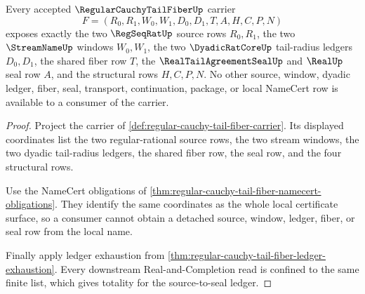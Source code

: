 \begin{theorem}
\label{thm:regular-cauchy-tail-fiber-source-seal-ledger-totality}
Every accepted $\RegularCauchyTailFiberUp$ carrier
$$
F=(R_0,R_1,W_0,W_1,D_0,D_1,T,A,H,C,P,N)
$$
exposes exactly the two $\RegSeqRatUp$ source rows $R_0,R_1$, the two $\StreamNameUp$ windows $W_0,W_1$, the two $\DyadicRatCoreUp$ tail-radius ledgers $D_0,D_1$, the shared fiber row $T$, the $\RealTailAgreementSealUp$ and $\RealUp$ seal row $A$, and the structural rows $H,C,P,N$. No other source, window, dyadic ledger, fiber, seal, transport, continuation, package, or local NameCert row is available to a consumer of the carrier.
\end{theorem}
\begin{proof}
Project the carrier of \autoref{def:regular-cauchy-tail-fiber-carrier}. Its displayed coordinates list the two regular-rational source rows, the two stream windows, the two dyadic tail-radius ledgers, the shared fiber row, the seal row, and the four structural rows.

Use the NameCert obligations of \autoref{thm:regular-cauchy-tail-fiber-namecert-obligations}. They identify the same coordinates as the whole local certificate surface, so a consumer cannot obtain a detached source, window, ledger, fiber, or seal row from the local name.

Finally apply ledger exhaustion from \autoref{thm:regular-cauchy-tail-fiber-ledger-exhaustion}. Every downstream Real-and-Completion read is confined to the same finite list, which gives totality for the source-to-seal ledger.
\end{proof}

